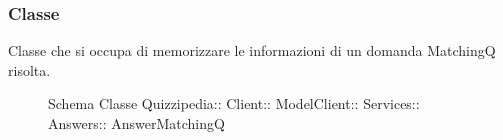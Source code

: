 \subsubsection{Classe }
Classe che si occupa di memorizzare le informazioni di un domanda MatchingQ risolta.
\begin{figure}[H]
\centering
\noindent{}
\caption[Schema Classe AnswerMatchingQ]{Schema Classe Quizzipedia:: Client:: ModelClient:: Services:: Answers:: AnswerMatchingQ}
\end{figure}

